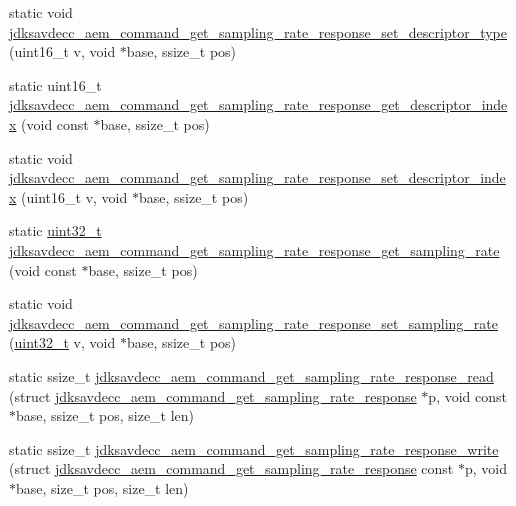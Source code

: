 \begin{DoxyCompactItemize}
static void \hyperlink{group__command__get__sampling__rate__response_ga082aeed3d621241ae5f7e8ce1c52ae56}{jdksavdecc\+\_\+aem\+\_\+command\+\_\+get\+\_\+sampling\+\_\+rate\+\_\+response\+\_\+set\+\_\+descriptor\+\_\+type} (uint16\+\_\+t v, void $\ast$base, ssize\+\_\+t pos)
\item 
static uint16\+\_\+t \hyperlink{group__command__get__sampling__rate__response_gada7b78ddb76b1d761c6785a28275227d}{jdksavdecc\+\_\+aem\+\_\+command\+\_\+get\+\_\+sampling\+\_\+rate\+\_\+response\+\_\+get\+\_\+descriptor\+\_\+index} (void const $\ast$base, ssize\+\_\+t pos)
\item 
static void \hyperlink{group__command__get__sampling__rate__response_gabd1650f3dca7cdb63a2cd4bdd0d27380}{jdksavdecc\+\_\+aem\+\_\+command\+\_\+get\+\_\+sampling\+\_\+rate\+\_\+response\+\_\+set\+\_\+descriptor\+\_\+index} (uint16\+\_\+t v, void $\ast$base, ssize\+\_\+t pos)
\item 
static \hyperlink{parse_8c_a6eb1e68cc391dd753bc8ce896dbb8315}{uint32\+\_\+t} \hyperlink{group__command__get__sampling__rate__response_gaf5dc52b2c5bb5c247c7bbfca25466dd9}{jdksavdecc\+\_\+aem\+\_\+command\+\_\+get\+\_\+sampling\+\_\+rate\+\_\+response\+\_\+get\+\_\+sampling\+\_\+rate} (void const $\ast$base, ssize\+\_\+t pos)
\item 
static void \hyperlink{group__command__get__sampling__rate__response_ga4528c2be2e80ae3e069df4caf45a5504}{jdksavdecc\+\_\+aem\+\_\+command\+\_\+get\+\_\+sampling\+\_\+rate\+\_\+response\+\_\+set\+\_\+sampling\+\_\+rate} (\hyperlink{parse_8c_a6eb1e68cc391dd753bc8ce896dbb8315}{uint32\+\_\+t} v, void $\ast$base, ssize\+\_\+t pos)
\item 
static ssize\+\_\+t \hyperlink{group__command__get__sampling__rate__response_ga2bf61f93ea171c124ae7056ff4f8e3ba}{jdksavdecc\+\_\+aem\+\_\+command\+\_\+get\+\_\+sampling\+\_\+rate\+\_\+response\+\_\+read} (struct \hyperlink{structjdksavdecc__aem__command__get__sampling__rate__response}{jdksavdecc\+\_\+aem\+\_\+command\+\_\+get\+\_\+sampling\+\_\+rate\+\_\+response} $\ast$p, void const $\ast$base, ssize\+\_\+t pos, size\+\_\+t len)
\item 
static ssize\+\_\+t \hyperlink{group__command__get__sampling__rate__response_gaa40c65951929d3a1424c00908341a70b}{jdksavdecc\+\_\+aem\+\_\+command\+\_\+get\+\_\+sampling\+\_\+rate\+\_\+response\+\_\+write} (struct \hyperlink{structjdksavdecc__aem__command__get__sampling__rate__response}{jdksavdecc\+\_\+aem\+\_\+command\+\_\+get\+\_\+sampling\+\_\+rate\+\_\+response} const $\ast$p, void $\ast$base, size\+\_\+t pos, size\+\_\+t len)
\end{DoxyCompactItemize}


